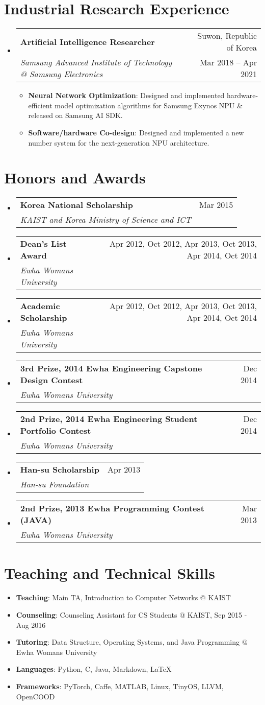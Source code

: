 \documentclass[letterpaper,oneside,11pt]{article}
\makeatletter
\newcommand{\resumeItem}[2]{
  \item\small{
    \textbf{#1}{: #2 \vspace{-2pt}}
  }
}
\newcommand{\resumeSubheading}[4]{
  \vspace{-2pt}\item
    \begin{tabularx}{0.97\textwidth}[t]{X@{\hspace{-5pt}}r}
      \textbf{#1} & #2 \\
      \textit{\small#3} & \small #4 \\
    \end{tabularx}\vspace{-6pt}
}
\newcommand{\awardsSubheading}[4]{
  \resumeSubheading{#1}{#2}{#3}{#4}\vspace{0pt}
}
\newcommand{\resumeSubHeadingListStart}{\begin{itemize}[leftmargin=*]}
\newcommand{\resumeSubHeadingListEnd}{\end{itemize}}
\newcommand{\resumeItemListStart}{\begin{itemize}}
\newcommand{\resumeItemListEnd}{\end{itemize}\vspace{-5pt}}
\makeatother
\begin{document}
\section{Industrial Research Experience}
\resumeSubHeadingListStart
    \resumeSubheading
      {Artificial Intelligence Researcher}{Suwon, Republic of Korea}
      {Samsung Advanced Institute of Technology @ Samsung Electronics}{Mar 2018 -- Apr 2021}
      \resumeItemListStart
        \resumeItem{Neural Network Optimization}{Designed and implemented hardware-efficient model optimization algorithms for Samsung Exynos NPU \& released on Samsung AI SDK.}
        \resumeItem{Software/hardware Co-design}{Designed and implemented a new number system for the next-generation NPU architecture.}
      \resumeItemListEnd
  \resumeSubHeadingListEnd

\section{Honors and Awards}
  \resumeSubHeadingListStart
    \awardsSubheading{Korea National Scholarship}{Mar 2015}
    {KAIST and Korea Ministry of Science and ICT}{}
    \awardsSubheading{Dean's List Award}{Apr 2012, Oct 2012, Apr 2013, Oct 2013, Apr 2014, Oct 2014}
    {Ewha Womans University}{}
    \awardsSubheading{Academic Scholarship}{Apr 2012, Oct 2012, Apr 2013, Oct 2013, Apr 2014, Oct 2014}
    {Ewha Womans University}{}
    \awardsSubheading{3rd Prize, 2014 Ewha Engineering Capstone Design Contest}{Dec 2014}
    {Ewha Womans University}{}
    \awardsSubheading{2nd Prize, 2014 Ewha Engineering Student Portfolio Contest}{Dec 2014}
    {Ewha Womans University}{}
    \awardsSubheading{Han-su Scholarship}{Apr 2013}
    {Han-su Foundation}{}
    \awardsSubheading{2nd Prize, 2013 Ewha Programming Contest (JAVA)}{Mar 2013}
    {Ewha Womans University}{}
  \resumeSubHeadingListEnd

%
\section{Teaching and Technical Skills}
 \resumeSubHeadingListStart
   \resumeItem{Teaching}{Main TA, Introduction to Computer Networks @ KAIST}
   \resumeItem{Counseling}{Counseling Assistant for CS Students @ KAIST, Sep 2015 - Aug 2016}
   \resumeItem{Tutoring}{Data Structure, Operating Systems, and Java Programming @ Ewha Womans University}
   \resumeItem{Languages}{Python, C, Java, Markdown, \LaTeX}
   \resumeItem{Frameworks}{PyTorch, Caffe, MATLAB, Linux, TinyOS, LLVM, OpenCOOD}
 \resumeSubHeadingListEnd
\end{document}
